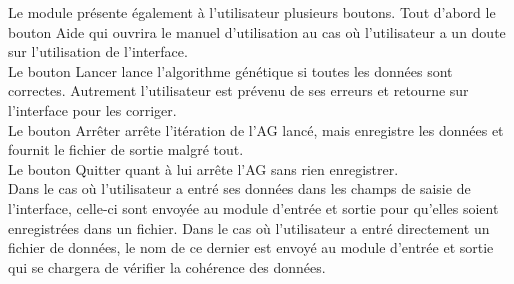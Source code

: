 \documentclass[a4paper,11pt]{article}
\begin{document}
			Le module présente également à l’utilisateur plusieurs boutons.
			Tout d’abord le bouton Aide qui ouvrira le manuel d’utilisation au cas où l’utilisateur a un doute sur l’utilisation de l’interface.\\
			Le bouton Lancer lance l’algorithme génétique si toutes les données sont correctes.
			Autrement l’utilisateur est prévenu de ses erreurs et retourne sur l’interface pour les corriger.\\
			Le bouton Arrêter arrête l’itération de l’AG lancé, mais enregistre les données et fournit le fichier de sortie malgré tout.\\
			Le bouton Quitter quant à lui arrête l’AG sans rien enregistrer.\\
			Dans le cas où l’utilisateur a entré ses données dans les champs de saisie de l’interface, celle-ci sont envoyée au module d’entrée et sortie pour qu’elles soient enregistrées dans un fichier.
			Dans le cas où l’utilisateur a entré directement un fichier de données, le nom de ce dernier est envoyé au module d’entrée et sortie qui se chargera de vérifier la cohérence des données.\\
\end{document}
